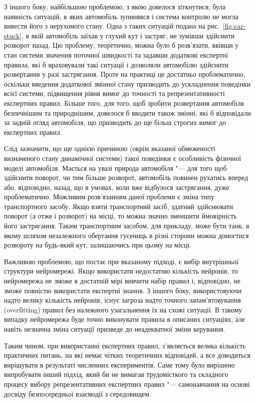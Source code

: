 \documentclass[a4paper,10pt,fleqn]{article}
\begin{document}
З іншого боку, найбільшою проблемою, з якою довелося зіткнутися, була наявність ситуацій, в яких автомобіль зупинявся і система контролю не могла вивести його з нерухомого стану. Одна з таких ситуацій подана на рис.~\ref{fig:car-stuck}, в якій автомобіль заїхав у глухий кут і застряг, не зумівши здійснити розворот назад. Цю проблему, теоретично, можна було б розв'язати, ввівши у стан системи значення поточної швидкості та задавши додаткові експертні правила, які б враховували такі ситуації і дозволяли автомобілю здійснити розвертання у разі застрягання. Проте на практиці це достатньо проблематично, оскільки введення додаткової змінної стану призводить до ускладнення поведінки всієї системи, підвищення рівня вимог до точності та репрезентативності експертних правил. Більше того, для того, щоб зробити розвертання автомобіля безпечнішим та природнішим, довелося б вводити також змінні, які б відповідали за задній огляд автомобіля, що призводить до ще більш строгих вимог до експертних правил.

Слід зазначити, що ще однією причиною (окрім вказаної обмеженості визначеного стану динамічної системи) такої поведінки є особливість фізичної моделі автомобіля. Мається на увазі природа автомобіля "--- для того щоб здійснити поворот, чи тим більше розворот, автомобіль повинен рухатись вперед або, відповідно, назад, що в умовах, коли вже відбулося застрягання, дуже проблематично. Можливим розв'язанням даної проблеми є зміна типу транспортного засобу. Якщо взяти транспортний засіб, здатний здійснювати поворот (а отже і розворот) на місці, то можна значно зменшити ймовірність його застрягання. Таким транспортним засобом, для прикладу, може бути танк, в якому шляхом незалежного обертання гусениць в різні сторони можна домогтися розвороту на будь-який кут, залишаючись при цьому на місці.

Важливою проблемою, що постає при вказаному підході, є вибір внутрішньої структури нейромережі. Якщо використати недостатню кількість нейронів, то нейромережа не зможе в достатній мірі вивчити набір правил і, відповідно, не зможе повністю використати експертні знання. З іншого боку, використовуючи надто велику кількість нейронів, існує загроза надто точного запам'ятовування (overfіttіng) правил без належного узагальнення їх на схожі ситуації. В такому випадку нейромережа буде точно виконувати правила в описаних ситуаціях, але навіть незначна зміна ситуації призведе до неадекватної зміни керування.

Таким чином, при використанні експертних правил, з'являється велика кількість практичних питань, на які немає чітких теоретичних відповідей, а все доводиться вирішувати в результаті численних експериментів. Саме тому було вирішено випробувати інший підхід, який би не вимагав трудомісткого та складного процесу вибору репрезентативних експертних правил "--- самонавчання на основі досвіду безпосередньої взаємодії з середовищем.
\end{document}
